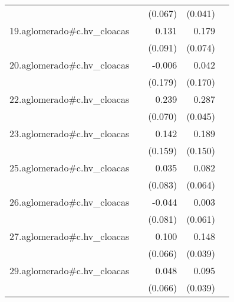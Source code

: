 {\begin{longtable}{l*{4}{D{.}{.}{-1}}}
            &                     &     (0.067)         &     (0.041)         &                     \\
\addlinespace
19.aglomerado#c.hv\_cloacas&                     &       0.131         &       0.179\sym{*}  &                     \\
            &                     &     (0.091)         &     (0.074)         &                     \\
\addlinespace
20.aglomerado#c.hv\_cloacas&                     &      -0.006         &       0.042         &                     \\
            &                     &     (0.179)         &     (0.170)         &                     \\
\addlinespace
22.aglomerado#c.hv\_cloacas&                     &       0.239\sym{***}&       0.287\sym{***}&                     \\
            &                     &     (0.070)         &     (0.045)         &                     \\
\addlinespace
23.aglomerado#c.hv\_cloacas&                     &       0.142         &       0.189         &                     \\
            &                     &     (0.159)         &     (0.150)         &                     \\
\addlinespace
25.aglomerado#c.hv\_cloacas&                     &       0.035         &       0.082         &                     \\
            &                     &     (0.083)         &     (0.064)         &                     \\
\addlinespace
26.aglomerado#c.hv\_cloacas&                     &      -0.044         &       0.003         &                     \\
            &                     &     (0.081)         &     (0.061)         &                     \\
\addlinespace
27.aglomerado#c.hv\_cloacas&                     &       0.100         &       0.148\sym{***}&                     \\
            &                     &     (0.066)         &     (0.039)         &                     \\
\addlinespace
29.aglomerado#c.hv\_cloacas&                     &       0.048         &       0.095\sym{*}  &                     \\
            &                     &     (0.066)         &     (0.039)         &                     \\

\end{longtable}}

